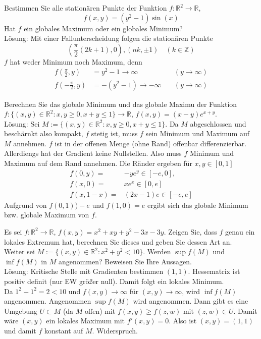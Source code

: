 \documentclass[parskip=full]{scrartcl}
\begin{document}
Bestimmen Sie alle stationären Punkte der Funktion $f : \mathbb{R}^2 \to \mathbb{R}$,
\begin{displaymath}
  f(x,y) = (y^2 - 1) \sin(x)
\end{displaymath}
Hat $f$ ein globales Maximum oder ein globales Minimum?\\
Lösung:
Mit einer Fallunterscheidung folgen die stationären Punkte
\begin{displaymath}
  \left(\frac{\pi}{2}\left(2k + 1\right), 0\right), (nk, \pm 1) \quad (k \in \mathbb{Z})
\end{displaymath}
$f$ hat weder Minimum noch Maximum, denn
\begin{align*}
  f\left(\frac{\pi}{2}, y\right) &= y^2 - 1 \to \infty &\quad (y \to \infty)\\
  f\left(-\frac{\pi}{2}, y\right) &= -(y^2 - 1) \to -\infty &\quad (y \to \infty)
\end{align*}

Berechnen Sie das globale Minimum und das globale Maximu der Funktion $f : \{(x,y) \in \mathbb{R}^2 : x,y \geq 0, x + y \leq 1\} \to \mathbb{R}$, $f(x,y) = (x-y)e^{x+y}$.\\
Lösung:
Sei $M := \{(x,y) \in \mathbb{R}^2 : x,y \geq 0, x + y \leq 1\}$.
Da $M$ abgeschlossen und beschärnkt also kompakt, $f$ stetig ist, muss $f$ sein Minimum und Maximum auf $M$ annehmen.
$f$ ist in der offenen Menge (ohne Rand) offenbar differenzierbar.
Allerdiengs hat der Gradient keine Nullstellen.
Also muss $f$ Minimum und Maximum auf dem Rand annehmen.
Die Ränder ergeben für $x,y \in [0,1]$
\begin{align*}
  f(0,y) =& -ye^y \in [-e,0],\\
  f(x,0) =& xe^x \in [0,e]\\
  f(x,1-x) =& (2x - 1)e \in [-e,e]
\end{align*}
Aufgrund von $f(0,1) ) -e$ und $f(1,0) = e$ ergibt sich das globale Minimum bzw. globale Maximum von $f$.

Es sei $f : \mathbb{R}^2 \to \mathbb{R}$, $f(x,y) = x^2 + xy + y^2 -3x -3y$.
Zeigen Sie, dass $f$ genau ein lokales Extremum hat, berechnen Sie dieses und geben Sie dessen Art an.\\
Weiter sei $M := \{(x,y) \in \mathbb{R}^2 : x^2 + y^2 < 10\}$.
Werden $\sup f(M)$ und $\inf f(M)$ in $M$ angenommen?
Beweisen Sie Ihre Aussagen.\\
Lösung:
Kritische Stelle mit Gradienten bestimmen $(1,1)$.
Hessematrix ist positiv definit (nur EW größer null).
Damit folgt ein lokales Minimum.\\
Da $1^2 + 1^2 = 2 < 10$ und $f(x,y) \to \infty$ für $(x,y) \to \infty$, wird $\inf f(M)$ angenommen.
Angenommen $\sup f(M)$ wird angenommen.
Dann gibt es eine Umgebung $U \subset M$ (da $M$ offen) mit $f(x,y) \geq f(z,w)$ mit $(z,w) \in U$.
Damit wäre $(x,y)$ ein lokales Maximum mit $f'(x,y) = 0$.
Also ist $(x,y) = (1,1)$ und damit $f$ konstant auf $M$.
Widerspruch.
\end{document}
